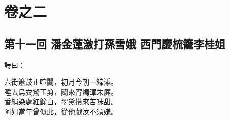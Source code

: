 \part*{{\titlename}卷之二}



\chapter*{第十一回 潘金蓮激打孫雪娥 西門慶梳籠李桂姐}


詩曰：

\begin{myquote}
六街簫鼓正喧闐，初月今朝一線添。\\睡去烏衣驚玉剪，鬬來宵燭渾朱簾。\\香綃染處紅餘白，翠黛攢來苦味甜。\\阿姐當年曾似此，從他戲汝不須嫌。
\end{myquote}

